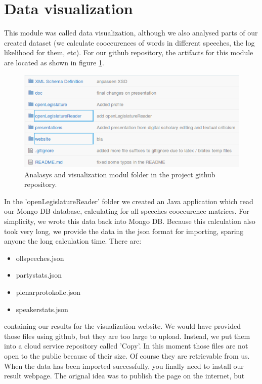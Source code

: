 \documentclass[12pt,paper=a4,nenglish]{scrreprt}
\begin{document}
\section{Data visualization}
This module was called data visualization, although we also analysed parts of
our created dataset (we calculate cooccurences of words in different speeches,
the log likelihood for them, etc). For our github repository, the artifacts for this
module are located as shown in figure \ref{pic:doc_visualization}. 
\begin{figure}[H] 
	\centering
	\includegraphics[scale=0.7]{res/visualization_folder.png}
	\caption{Analasys and visualization modul folder in the project github
	repository.}%
	\label{pic:doc_visualization}%
\end{figure}%
In the 'openLegislatureReader' folder we created an Java application which read
our Mongo DB database, calculating for all speeches cooccurence matrices. For simplicity,
we wrote this data back into Mongo DB. Because this calculation also took very
long, we provide the data in the json format for importing, sparing anyone the
long calculation time. There are: 	
\begin{itemize}
  \item ollspeeches.json
  \item partystats.json
  \item plenarprotokolle.json
  \item speakerstats.json
\end{itemize}
containing our results for the visualization website. We would have
provided those files using github, but they are too large to upload. Instead, we
put them into a cloud service repository called 'Copy'. In this moment 
those files are not open to the public because
of their size. Of course they are
retrievable from us. \\ 
When the data has been imported successfully, you finally need to install our
result webpage. The orignal idea was to publish the page on the internet, but
\end{document}

